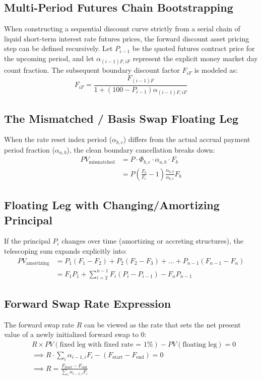 \documentclass{article}
\begin{document}
\subsection{Multi-Period Futures Chain Bootstrapping}
When constructing a sequential discount curve strictly from a serial chain of liquid short-term interest rate futures prices, the forward discount asset pricing step can be defined recursively. Let $P_{i-1}$ be the quoted futures contract price for the upcoming period, and let $\alpha_{(i-1)F, iF}$ represent the explicit money market day count fraction. The subsequent boundary discount factor $F_{iF}$ is modeled as:
\begin{equation}
    F_{iF} = \frac{F_{(i-1)F}}{1 + (100 - P_{i-1})\alpha_{(i-1)F,iF}} \tag{8.31}
\end{equation}

\subsection{The Mismatched / Basis Swap Floating Leg}
When the rate reset index period ($\alpha_{b,c}$) differs from the actual accrual payment period fraction ($\alpha_{a,b}$), the clean boundary cancellation breaks down:
\begin{align}
    PV_{\text{mismatched}} &= P \cdot \Phi_{b,c} \cdot \alpha_{a,b} \cdot F_b \nonumber \\
    &= P \left( \frac{F_b}{F_c} - 1 \right) \frac{\alpha_{a,b}}{\alpha_{b,c}} F_b
\end{align}

\subsection{Floating Leg with Changing/Amortizing Principal}
If the principal $P_i$ changes over time (amortizing or accreting structures), the telescoping sum expands explicitly into:
\begin{align}
    PV_{\text{amortizing}} &= P_1(F_1 - F_2) + P_2(F_2 - F_3) + \dots + P_{n-1}(F_{n-1} - F_n) \nonumber \\
    &= F_1P_1 + \sum_{i=2}^{n-1}F_{i}(P_{i}-P_{i-1}) - F_n P_{n-1}
\end{align}

\subsection{Forward Swap Rate Expression}
The forward swap rate $R$ can be viewed as the rate that sets the net present value of a newly initialized forward swap to 0:
\begin{align}
    & R\times PV(\text{fixed leg with fixed rate = 1\%}) - PV(\text{floating leg})=0 \nonumber \\
    & \implies R \cdot \sum_i \alpha_{i-1,i} F_i - (F_{\text{start}} - F_{\text{end}}) = 0 \nonumber \\
    & \implies R = \frac{F_{\text{start}} - F_{\text{end}}}{\sum_i \alpha_{i-1,i} F_i} 
\end{align}
\end{document}
